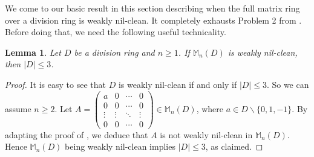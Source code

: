 \documentclass[12]{amsart}
\newtheorem{lem}[thm]{Lemma}
\theoremstyle{definition}
\numberwithin{equation}{section}
\begin{document}
We come to our basic result in this section describing when the full matrix ring over a division ring is weakly nil-clean. It completely exhausts Problem 2 from \cite{DM14}. Before doing that, we need the following useful technicality.

\begin{lem}\label{power}
Let $D$ be a division ring and $n\ge 1$. If ${\mathbb M}_n(D)$ is weakly nil-clean, then $|D|\le 3$.
\end{lem}

\begin{proof}
It is easy to see that $D$ is weakly nil-clean if and only if $|D|\le 3$. So we can assume $n\ge 2$.
Let $A=\begin{pmatrix}a&0&\cdots &0\\
                       0&0&\cdots &0\\
                       \vdots&\vdots&\ddots&\vdots\\
                       0&0&\cdots&0\end{pmatrix}\in {\mathbb M}_n(D)$, where $a\in D\backslash \{0, 1, -1\}$. By adapting the proof of \cite[Theorem 3]{KLZ14}, we deduce that $A$ is not weakly nil-clean in ${\mathbb M}_n(D)$. Hence ${\mathbb M}_n(D)$ being weakly nil-clean implies $|D|\le 3$, as claimed.
\end{proof}
\end{document}
